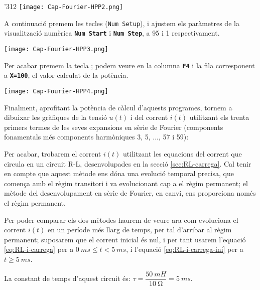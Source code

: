 \begin{exemple}
\begin{dingautolist}{'312}
            \texttt{[image: Cap-Fourier-HPP2.png]}

        \item  A continuació premem les tecles   (\texttt{Num Setup}), i ajustem els paràmetres de la visualització numèrica \texttt{\textbf{Num Start}} i \texttt{\textbf{Num Step}}, a 95 i 1 respectivament.

            \texttt{[image: Cap-Fourier-HPP3.png]}

        \item Per acabar premem la tecla ; podem veure en la columna \texttt{\textbf{F4}} i la fila corresponent a \texttt{\textbf{X=100}}, el valor calculat de la potència.

            \texttt{[image: Cap-Fourier-HPP4.png]}

    \end{dingautolist}

    Finalment, aprofitant la potència de càlcul d'aquests programes, tornem a dibuixar les gràfiques de la tensió $u(t)$ i del corrent $i(t)$ utilitzant els trenta primers termes de les seves expansions en sèrie de Fourier (components fonamentals més components harmòniques 3, 5, ..., 57 i 59):
    \vspace{-2mm}
    \begin{center}
      
    \end{center}

    Per acabar, trobarem el corrent $i(t)$ utilitzant les equacions del corrent que circula en un circuit R-L, desenvolupades en la secció \vref{sec:RL-carrega}. Cal tenir en compte que aquest mètode ens dóna una evolució temporal precisa, que comença amb el règim transitori i va evolucionant cap a el règim permanent; el mètode del desenvolupament en sèrie de Fourier, en canvi, ens proporciona només el règim permanent.

    Per poder comparar els dos mètodes haurem de veure  ara com evoluciona el corrent $i(t)$ en un període més llarg de temps, per tal d'arribar al règim permanent; suposarem que el corrent inicial és nul, i per tant usarem l'equació \eqref{eq:RL-i-carrega} per a $\SI{0}{ms} \leq t < \SI{5}{ms}$, i l'equació \eqref{eq:RL-i-carrega-ini} per a $t \geq \SI{5}{ms}$.

    La constant de temps d'aquest circuit és: $\tau = \dfrac{\SI{50}{mH}}{\SI{10}{\ohm}} = \SI{5}{ms}$.



\end{exemple}
